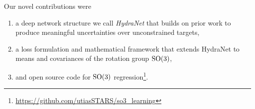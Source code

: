 Our novel contributions were
\begin{enumerate}
\item a deep network structure we call \textit{HydraNet} that builds on prior work \citep{Lakshminarayanan2017,Osband2016} to produce meaningful uncertainties over unconstrained targets,
\item a loss formulation and mathematical framework that extends HydraNet to means and covariances of the rotation group $\mathrm{SO}(3)$,
\item and open source code for $\mathrm{SO}(3)$ regression\footnote{\url{https://github.com/utiasSTARS/so3_learning}}.
\end{enumerate}

